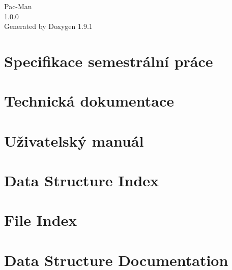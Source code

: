 \let\mypdfximage\pdfximage\def\pdfximage{\immediate\mypdfximage}\documentclass[twoside]{book}
\newcommand{\+}{\discretionary{\mbox{\scriptsize$\hookleftarrow$}}{}{}}
\newcommand{\clearemptydoublepage}{%
  \newpage{\pagestyle{empty}\cleardoublepage}%
}
\begin{document}
\raggedbottom

\begin{titlepage}
\vspace*{7cm}
\begin{center}%
{\Large Pac-\/\+Man \\[1ex]\large 1.\+0.\+0 }\\
\vspace*{1cm}
{\large Generated by Doxygen 1.9.1}\\
\end{center}
\end{titlepage}
\clearemptydoublepage
{}
\tableofcontents
\clearemptydoublepage
{}

\chapter{Specifikace semestrální práce}
\label{index}
\chapter{Technická dokumentace}
\label{md__c___users__petr__documents_apo_semestralka__tech_documentation}

\chapter{Uživatelský manuál}
\label{md__c___users__petr__documents_apo_semestralka__user_manual}

\chapter{Data Structure Index}

\chapter{File Index}

\chapter{Data Structure Documentation}











\end{document}
